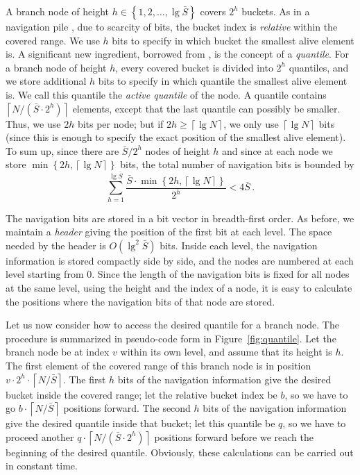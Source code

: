 \documentclass[final,onetabnum,onefignum,onethmnum]{siamltex}
\newcommand{\ceils}[1]{\left\lceil #1 \right\rceil}
\newcommand{\set}[1]{\left\{#1\right\}}
\begin{document}
A branch node of height $h \in \set{1,2,\ldots,\lg \bar{S}}$ covers
$2^h$ buckets. As in a navigation pile \cite{KV03}, due to scarcity of bits, 
the bucket index is \emph{relative} within the covered range. We use $h$ bits to
specify in which bucket the smallest alive element is.  
A significant new ingredient, borrowed from \cite{PR98}, is the concept of a
\emph{quantile}. For a branch node of height
$h$, every covered bucket is divided into $2^h$ quantiles, and we
store additional $h$ bits to specify in which quantile the smallest
alive element is.  We call this quantile the {\it active quantile} of the node. 
A quantile contains $\ceils{N/(\bar{S} \cdot 2^h)}$
elements, except that the last quantile can possibly be smaller.
Thus, we use $2h$ bits per node; but if $2h \geq \ceils{\lg{N}}$, we
only use $\ceils{\lg{N}}$ bits (since this is enough to
specify the exact position of the smallest alive element).  To sum up,
since there are $\bar{S}/2^h$ nodes of height $h$ and since at each
node we store $\min\!\set{2h, \ceils{\lg{N}}}$ bits, the total number of
navigation bits is bounded by
$$\sum_{h=1}^{\lg \bar{S}} \frac{\bar{S} \cdot \min\!\set{2h,
    \ceils{\lg{N}}}}{2^h} < 4\bar{S}\,.$$

The navigation bits are stored in a bit vector in breadth-first order.
As before, we maintain a \emph{header} giving the position of the first bit
at each level. The space needed by the header is $O(\lg^2 \bar{S})$
bits. Inside each level, the navigation information is stored compactly
side by side, and the nodes are numbered at each level starting from
$0$.  Since the length of the navigation bits is fixed for all nodes
at the same level, using the height and the index of a node, it is
easy to calculate the positions where the navigation bits of that node
are stored.

Let us now consider how to access the desired quantile for a branch
node. The procedure is summarized in pseudo-code form
in Figure~\ref{fig:quantile}. Let the branch node be at index $v$ within
its own level, and assume that its height is $h$. The first element of
the covered range of this branch node is in position $v \cdot 2^h \cdot
\ceils{N/\bar{S}}$.  The first $h$ bits of the navigation information
give the desired bucket inside the covered range; let the relative
bucket index be $b$, so we have to
go $b \cdot \ceils{N/\bar{S}}$ positions forward. The second $h$ bits
of the navigation information give the desired quantile inside that
bucket; let this quantile be $q$, so we have to proceed another
$q \cdot \ceils{N/(\bar{S} \cdot 2^h)}$ positions forward before we
reach the beginning of the desired quantile. Obviously, these
calculations can be carried out in constant time.
\end{document}
